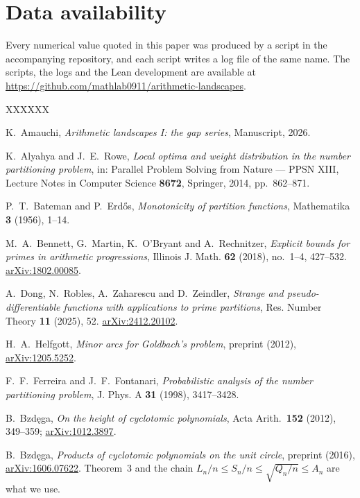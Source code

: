 \documentclass[11pt,a4paper]{article}
\theoremstyle{plain}
\theoremstyle{definition}
\theoremstyle{remark}
\begin{document}
\section*{Data availability}

Every numerical value quoted in this paper was produced by a script in the
accompanying repository, and each script writes a log file of the same name.
The scripts, the logs and the Lean development are available at
\url{https://github.com/mathlab0911/arithmetic-landscapes}.

\begin{thebibliography}{XXXXXX}

K.~Amauchi,
\emph{Arithmetic landscapes I: the gap series},
Manuscript, 2026.

K.~Alyahya and J.~E.~Rowe,
\emph{Local optima and weight distribution in the number partitioning problem},
in: Parallel Problem Solving from Nature --- PPSN XIII,
Lecture Notes in Computer Science \textbf{8672}, Springer, 2014, pp.~862--871.

P.~T.~Bateman and P.~Erd\H{o}s,
\emph{Monotonicity of partition functions},
Mathematika \textbf{3} (1956), 1--14.

M.~A.~Bennett, G.~Martin, K.~O'Bryant and A.~Rechnitzer,
\emph{Explicit bounds for primes in arithmetic progressions},
Illinois J. Math. \textbf{62} (2018), no.~1--4, 427--532.
\href{https://arxiv.org/abs/1802.00085}{arXiv:1802.00085}.

A.~Dong, N.~Robles, A.~Zaharescu and D.~Zeindler,
\emph{Strange and pseudo-differentiable functions with applications to prime
partitions},
Res. Number Theory \textbf{11} (2025), 52.
\href{https://arxiv.org/abs/2412.20102}{arXiv:2412.20102}.

H.~A.~Helfgott,
\emph{Minor arcs for Goldbach's problem}, preprint (2012),
\href{https://arxiv.org/abs/1205.5252}{arXiv:1205.5252}.

F.~F.~Ferreira and J.~F.~Fontanari,
\emph{Probabilistic analysis of the number partitioning problem},
J. Phys. A \textbf{31} (1998), 3417--3428.

B.~Bzd\k{e}ga,
\emph{On the height of cyclotomic polynomials},
Acta Arith.\ \textbf{152} (2012), 349--359;
\href{https://arxiv.org/abs/1012.3897}{arXiv:1012.3897}.

B.~Bzd\k{e}ga,
\emph{Products of cyclotomic polynomials on the unit circle}, preprint (2016),
\href{https://arxiv.org/abs/1606.07622}{arXiv:1606.07622}.
Theorem~3 and the chain $L_n/n\le S_n/n\le\sqrt{Q_n/n}\le A_n$ are what we use.


\end{thebibliography}
\end{document}
